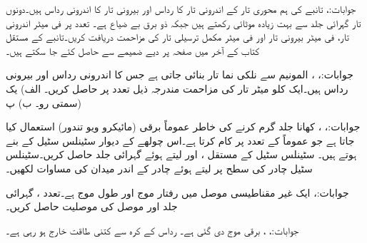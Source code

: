 جوابات:، 
تانبے کی ہم محوری تار کے اندرونی تار کا رداس  اور  بیرونی تار کا اندرونی رداس  ہیں۔دونوں تار گہرائی جلد  سے بہت زیادہ موٹائی رکھتے ہیں جبکہ ذو برق بے ضیاع ہے۔ تعدد پر فی میٹر اندرونی تار، فی میٹر بیرونی تار اور فی میٹر مکمل ترسیلی تار کی مزاحمت دریافت کریں۔تانبے کے مستقل کتاب کے آخر میں صفحہ  پر دیے ضمیمے سے حاصل کئے جا سکتے ہیں۔

جوابات:، ، 
المونیم  سے نلکی نما تار بنائی جاتی ہے جس کا اندرونی رداس  اور بیرونی رداس  ہیں۔ایک کلو میٹر تار کی مزاحمت مندرجہ ذیل تعدد پر حاصل کریں۔ الف) یک سمتی رو۔ ب) پ) 

جوابات:، ، 
کھانا جلد گرم کرنے کی خاطر عموماً برقی  (مائیکرو ویو تندور)  استعمال کیا جاتا ہے جو عموماً  کے تعدد پر کام کرتا ہے۔اس چولھے کے دیوار سٹینلس سٹیل کے بنے ہوتے ہیں۔ سٹینلس سٹیل کے مستقل ،  اور  لیتے ہوئے گہرائی جلد  حاصل کریں۔سٹینلس سٹیل چادر کی سطح پر
  لیتے ہوئے چادر کے اندر میدان کی مساوات لکھیں۔

جوابات:،    
ایک غیر مقناطیسی موصل میں رفتار موج  اور طول موج  ہے۔تعدد ، گہرائی جلد   اور موصل کی موصلیت  حاصل کریں۔

جوابات:، ،   
برقی موج  دی گئی ہے۔ رداس  کے کرہ سے کتنی طاقت خارج ہو رہی ہے۔

